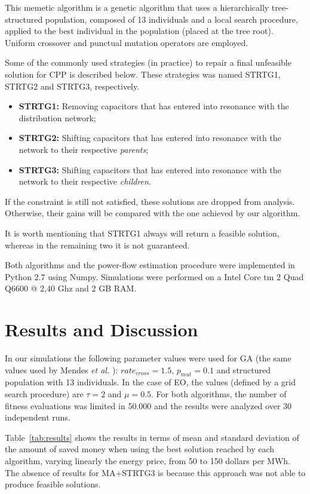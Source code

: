 \documentclass[11pt]{article}
\begin{document}
This memetic algorithm is a genetic algorithm that uses a hierarchically
tree-structured population, composed of 13 individuals and a local search
procedure, applied to the best individual in the population (placed at the 
tree root). Uniform crossover and punctual mutation operators are employed.

Some of the commonly used strategies (in practice) to repair a final unfeasible solution
for CPP is described below. These strategies was named STRTG1, STRTG2 and STRTG3, respectively.

\begin{itemize}
\item {\bf STRTG1:} Removing capacitors that has entered into resonance with the distribution network;
\item {\bf STRTG2:} Shifting capacitors that has entered into resonance with the network to their respective
\emph{parents};
\item {\bf STRTG3:} Shifting capacitors that has entered into resonance with the network to their respective
\emph{children}.
\end{itemize}

If the constraint is still not satisfied, these solutions are dropped from analysis.
Otherwise, their gains will be compared with the one achieved by our algorithm.

It is worth mentioning that STRTG1 always will return a feasible solution, whereas in 
the remaining two it is not guaranteed.

Both algorithms and the power-flow estimation procedure were implemented in Python 2.7 using Numpy. 
Simulations were performed on a Intel Core tm 2 Quad Q6600 @ 2,40 Ghz and 2 GB RAM.

\section{Results and Discussion}
\label{sec:resultados}

In our simulations the following parameter values were used for GA (the 
same values used by Mendes {\it et al.} \citep{Mendes2005}): $rate_{cross}=1.5$, 
$p_{mut}=0.1$ and structured population with 13 individuals. In the case 
of EO, the values (defined by a grid search procedure) are $\tau=2$ and $\mu=0.5$.
For both algorithms, the number of fitness evaluations was limited in 50.000
and the results were analyzed over 30 independent runs.

Table~\ref{tab:results} shows the results in terms of mean and standard deviation of the
amount of saved money when using the best solution reached by each algorithm, 
varying linearly the energy price, from 50 to 150 dollars per MWh. The absence of results
for MA+STRTG3 is because this approach was not able to produce feasible solutions.
\end{document}
